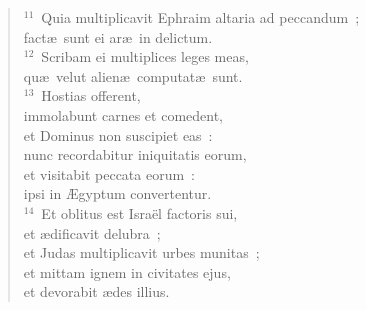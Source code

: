 \begin{flushleft}
\begin{verse}
${}^{11}$~Quia multiplicavit Ephraim altaria ad peccandum~;\\ fact\ae\ sunt ei ar\ae\ in delictum.\\
${}^{12}$~Scribam ei multiplices leges meas,\\ qu\ae\ velut alien\ae\ computat\ae\ sunt.\\
${}^{13}$~Hostias offerent,\\ immolabunt carnes et comedent,\\ et Dominus non suscipiet eas~:\\ nunc recordabitur iniquitatis eorum,\\ et visitabit peccata eorum~:\\ ipsi in \AE gyptum convertentur.\\
${}^{14}$~Et oblitus est Isra\"el factoris sui,\\ et \ae dificavit delubra~;\\ et Judas multiplicavit urbes munitas~;\\ et mittam ignem in civitates ejus,\\ et devorabit \ae des illius.\end{verse}\end{flushleft}


